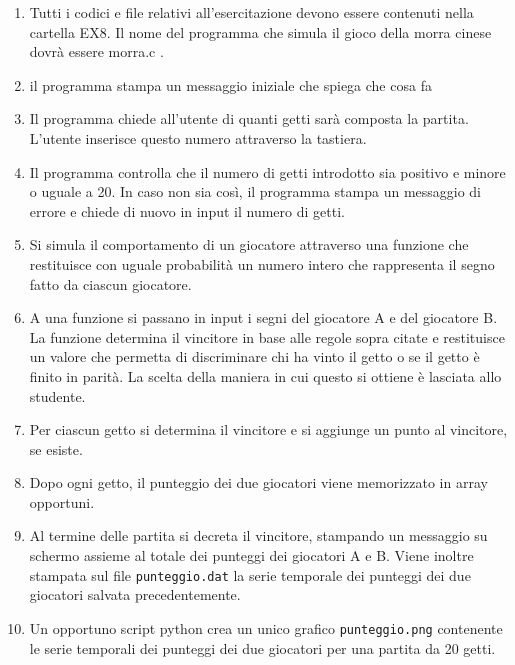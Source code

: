 \documentclass[11pt]{article}
\begin{document}
\begin{enumerate}
\item Tutti i codici e file relativi all'esercitazione devono essere contenuti nella cartella EX8. Il nome del programma che simula il gioco della morra cinese dovr\`{a} essere morra.c .
\item il programma stampa un messaggio iniziale che spiega che cosa fa
\item Il programma chiede all'utente di quanti getti sar\`a composta la partita.
L'utente inserisce questo numero attraverso la tastiera.
\item Il programma controlla che il numero di getti introdotto sia positivo e minore o uguale a 20. In caso non sia cos\`{i}, il programma stampa un messaggio di errore e chiede di nuovo in input il numero di getti.
\item Si simula il comportamento di un giocatore attraverso una funzione che
restituisce con uguale probabilit\`a un numero intero che rappresenta il segno
fatto da ciascun giocatore.
\item  A una funzione si passano in input i segni del giocatore A e del giocatore B. La
funzione determina il vincitore in base alle regole sopra citate e restituisce
un valore che permetta di discriminare chi ha vinto il getto o se il getto \`e finito in parit\`a. La scelta della maniera in cui questo si ottiene \`e lasciata
allo studente.
\item Per ciascun getto si determina il vincitore e si aggiunge un punto al vincitore, se esiste.
\item Dopo ogni getto, il punteggio dei due giocatori viene memorizzato in array opportuni.
\item Al termine delle partita si decreta il vincitore, stampando un messaggio su schermo assieme al totale dei punteggi dei giocatori A e B. Viene inoltre stampata sul file \texttt{punteggio.dat} la serie temporale dei punteggi dei due giocatori salvata precedentemente.
\item Un opportuno script python crea un unico grafico \texttt{punteggio.png} contenente le serie temporali dei punteggi dei due giocatori per una partita da 20 getti.

\end{enumerate}
\end{document}
